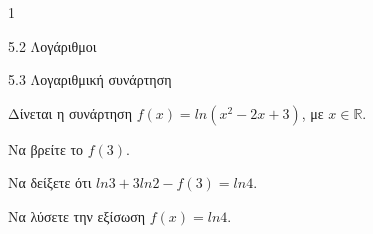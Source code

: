 \begin{ylh}{1}
\item 5.2 Λογάριθμοι
\item 5.3 Λογαριθμική συνάρτηση
\end{ylh}
Δίνεται η συνάρτηση $f(x) = ln(x^{2} - 2x + 3)$, με $x\mathbb{\in R}$.
\begin{alist}
\item Να βρείτε το $f(3)$.
\item Να δείξετε ότι $ln3 + 3ln2 - f(3) = ln4$.
\item Να λύσετε την εξίσωση $f(x) = ln4$.
\end{alist}

